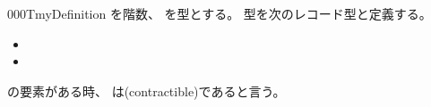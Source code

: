 \documentclass[index]{subfiles}
\begin{document}
\begin{myBlock}{000T}{myDefinition}
  を階数、
  を型とする。
  型を次のレコード型と定義する。
  \begin{itemize}
    \item {}
    \item {}
  \end{itemize}
  の要素がある時、
  は(contractible)であると言う。
\end{myBlock}
\end{document}

